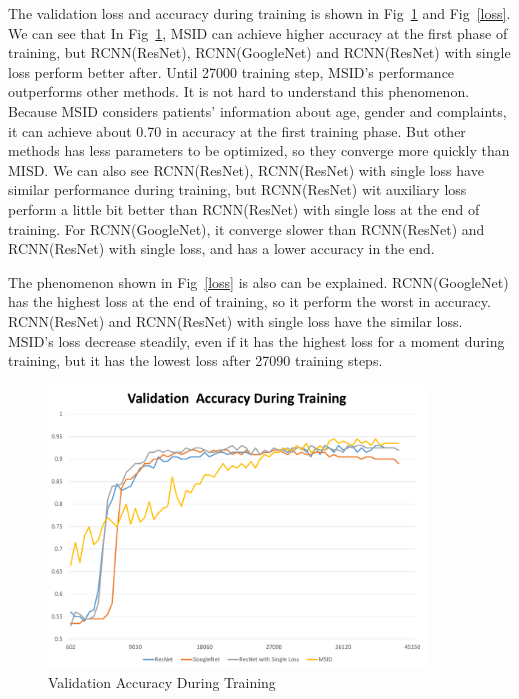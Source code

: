 \documentclass[runningheads]{llncs}
\begin{document}
The validation loss and accuracy during training is shown in Fig~\ref{aac} and Fig~\ref{loss}. We can see that In Fig~\ref{aac}, MSID can achieve higher accuracy at the first phase of training, but RCNN(ResNet), RCNN(GoogleNet) and RCNN(ResNet) with single loss perform better after. Until 27000 training step, MSID's performance outperforms other methods. It is not hard to understand this phenomenon. Because MSID considers patients' information about age, gender and complaints, it can achieve about 0.70 in accuracy at the first training phase. But other methods has less parameters to be optimized, so they converge more quickly than MISD. We can also see RCNN(ResNet), RCNN(ResNet) with single loss have similar performance during training, but RCNN(ResNet) wit auxiliary loss perform a little bit better than RCNN(ResNet) with single loss at the end of training. For RCNN(GoogleNet), it converge slower than RCNN(ResNet) and RCNN(ResNet) with single loss, and has a lower accuracy in the end.

The phenomenon shown in Fig~\ref{loss} is also can be explained. RCNN(GoogleNet) has the highest loss at the end of training, so it perform the worst in accuracy. RCNN(ResNet) and RCNN(ResNet) with single loss have the similar loss. MSID's loss decrease steadily, even if it has the highest loss for a moment during training, but it has the lowest loss after 27090 training steps.

\begin{figure}[htb]
    \centerline{\includegraphics[width=100mm]{aac.pdf}}
    \vspace{-0cm}
    \caption{Validation Accuracy During Training}
    \vspace{-0cm}
    \label{aac}
    \end{figure}
\end{document}
